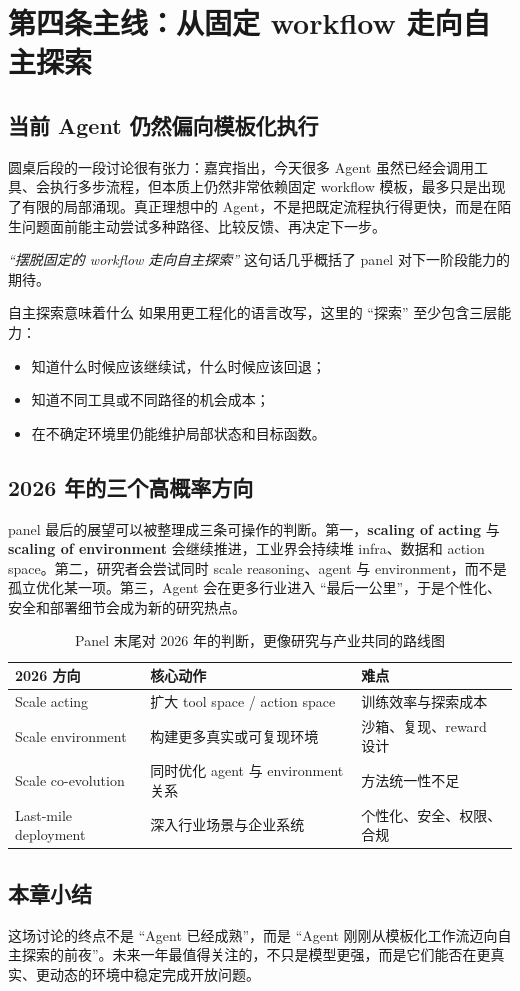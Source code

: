 \section{第四条主线：从固定 workflow 走向自主探索}

\subsection{当前 Agent 仍然偏向模板化执行}
圆桌后段的一段讨论很有张力：嘉宾指出，今天很多 Agent 虽然已经会调用工具、会执行多步流程，但本质上仍然非常依赖固定 workflow 模板，最多只是出现了有限的局部涌现。真正理想中的 Agent，不是把既定流程执行得更快，而是在陌生问题面前能主动尝试多种路径、比较反馈、再决定下一步。

\textit{``摆脱固定的 workflow 走向自主探索''} 这句话几乎概括了 panel 对下一阶段能力的期待。

\begin{importantbox}{自主探索意味着什么}
如果用更工程化的语言改写，这里的 ``探索'' 至少包含三层能力：
\begin{itemize}
  \item 知道什么时候应该继续试，什么时候应该回退；
  \item 知道不同工具或不同路径的机会成本；
  \item 在不确定环境里仍能维护局部状态和目标函数。
\end{itemize}
\end{importantbox}

\subsection{2026 年的三个高概率方向}
panel 最后的展望可以被整理成三条可操作的判断。第一，\textbf{scaling of acting} 与 \textbf{scaling of environment} 会继续推进，工业界会持续堆 infra、数据和 action space。第二，研究者会尝试同时 scale reasoning、agent 与 environment，而不是孤立优化某一项。第三，Agent 会在更多行业进入 ``最后一公里''，于是个性化、安全和部署细节会成为新的研究热点。

\begin{table}[H]
\centering
\begin{tabular}{p{3.1cm}p{4.1cm}p{4.4cm}}
\toprule
\textbf{2026 方向} & \textbf{核心动作} & \textbf{难点} \\
\midrule
Scale acting & 扩大 tool space / action space & 训练效率与探索成本 \\
Scale environment & 构建更多真实或可复现环境 & 沙箱、复现、reward 设计 \\
Scale co-evolution & 同时优化 agent 与 environment 关系 & 方法统一性不足 \\
Last-mile deployment & 深入行业场景与企业系统 & 个性化、安全、权限、合规 \\
\bottomrule
\end{tabular}
\caption{Panel 末尾对 2026 年的判断，更像研究与产业共同的路线图}
\end{table}

\subsection{本章小结}
这场讨论的终点不是 ``Agent 已经成熟''，而是 ``Agent 刚刚从模板化工作流迈向自主探索的前夜''。未来一年最值得关注的，不只是模型更强，而是它们能否在更真实、更动态的环境中稳定完成开放问题。

